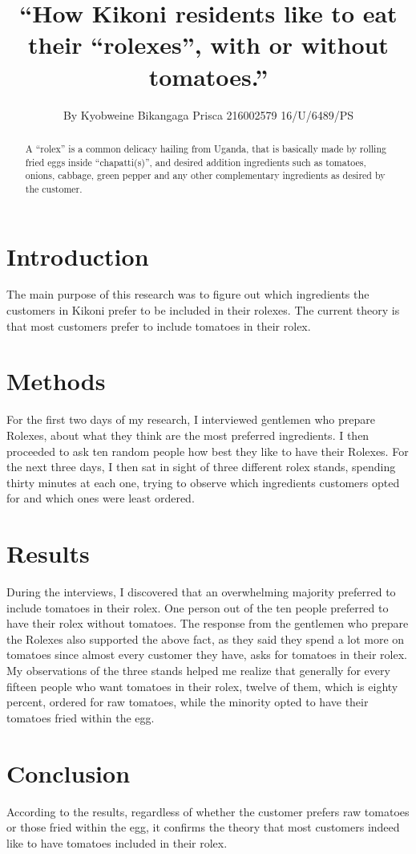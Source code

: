 \documentclass[A4]{article}
\title{“How Kikoni residents like to eat their “rolexes”, with or without tomatoes.”}
\author{By Kyobweine Bikangaga Prisca
	216002579
	16/U/6489/PS
}
\begin{document}
\maketitle

\begin{abstract}
A “rolex” is a common delicacy hailing from Uganda, that is basically made by rolling fried eggs inside “chapatti(s)”, and desired addition ingredients such as tomatoes, onions, cabbage, green pepper and any other complementary ingredients as desired by the customer.
\end{abstract}

\section{Introduction}
The main purpose of this research was to figure out which ingredients the customers in Kikoni prefer to be included in their rolexes. The current theory is that most customers prefer to include tomatoes in their rolex.
\section{Methods}
For the first two days of my research, I interviewed gentlemen who prepare Rolexes, about what they think are the most preferred ingredients. I then proceeded to ask ten random people how best they like to have their Rolexes.
For the next three days, I then sat in sight of three different rolex stands, spending thirty minutes at each one, trying to observe which ingredients customers opted for and which ones were least ordered.
\section{Results}
During the interviews, I discovered that an overwhelming majority preferred to include tomatoes in their rolex. One person out of the ten people preferred to have their rolex without tomatoes. The response from the gentlemen who prepare the Rolexes also supported the above fact, as they said they spend a lot more on tomatoes since almost every customer they have, asks for tomatoes in their rolex.
My observations of the three stands helped me realize that generally for every fifteen people who want tomatoes in their rolex, twelve of them, which is eighty percent, ordered for raw tomatoes, while the minority opted to have their tomatoes fried within the egg. 
\section{Conclusion}
According to the results, regardless of whether the customer prefers raw tomatoes or those fried within the egg, it confirms the theory that most customers indeed like to have tomatoes included in their rolex.
\
\end{document}
